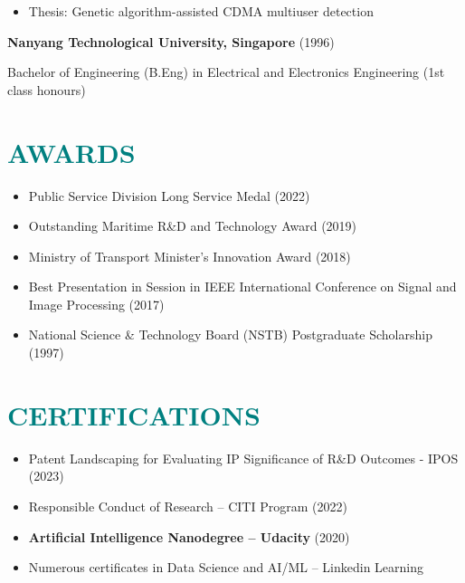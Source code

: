 \documentclass[a4paper, 11pt]{article}
\begin{document}
	\vspace{-10pt}
	
	\begin{itemize}[leftmargin=*, itemsep=-1mm]
		
		\item Thesis: Genetic algorithm-assisted CDMA multiuser detection
		
	\end{itemize}
	
	\vspace{3pt}
	
	{\raggedleft \bf Nanyang Technological University, Singapore} (1996)
	
	{\raggedleft Bachelor of Engineering (B.Eng) in Electrical and Electronics Engineering (1st class honours)}
	

\section{\textcolor{teal}{\bf{AWARDS}}}

	\vspace{3pt}
	
	\begin{itemize}[leftmargin=*, itemsep=-1mm]
		
		\item Public Service Division Long Service Medal (2022)
		
		\item Outstanding Maritime R\&D and Technology Award (2019)
		
		\item Ministry of Transport Minister’s Innovation Award (2018)
		
		\item Best Presentation in Session in IEEE International Conference on Signal and Image Processing (2017)
		
		\item National Science \& Technology Board (NSTB) Postgraduate Scholarship (1997)
		
	\end{itemize}
	
	
\section{\textcolor{teal}{\bf{CERTIFICATIONS}}}

	\vspace{3pt}
	
	\begin{itemize}[leftmargin=*, itemsep=-1mm]
		
		\item Patent Landscaping for Evaluating IP Significance of R\&D Outcomes - IPOS (2023)
		
		\item Responsible Conduct of Research – CITI Program (2022)
		
		\item {\bf Artificial Intelligence Nanodegree – Udacity} (2020)
		
		\item Numerous certificates in Data Science and AI/ML – Linkedin Learning
		
	\end{itemize}
	
\end{document}
